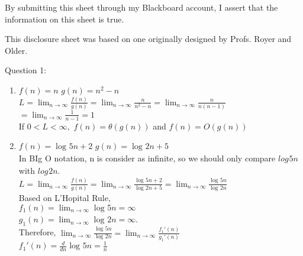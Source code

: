 \documentclass[12pt]{article}
\begin{document}
\vspace*{40ex}

By submitting this sheet through my Blackboard account, I assert that the information on this sheet is true.


\hfill {\tiny This disclosure sheet was based on one originally designed
  by
  Profs. Royer and Older.}


\pagebreak
\large Question 1:\\
\normalsize 
\begin{enumerate}[label=(\alph*)]
  \item $f(n) = n$ \hspace{1cm} $g(n) = n^2 - n$ \vspace{1mm} \\
    $L = \lim_{n\to\infty} \frac{f(n)}{g(n)} = \lim_{n\to\infty} \frac{n}{n^2 - n} = \lim_{n\to\infty} \frac{n}{n(n-1)}$ \vspace{1mm} \\
    $= \lim_{n\to\infty} \frac{1}{n - 1} = 1$ \vspace{1mm} \\
    If $0 < L < \infty,$ $f(n) = \theta(g(n))$ and $f(n) = O(g(n)) $
  \item $f(n) = \log_{}{5n} + 2$ \hspace{1cm} $g(n) = \log_{}{2n} + 5$ \vspace{1mm} \\
    In BIg O notation, n is consider as infinite, so we should only compare $log_{}{5n}$ with $log_{}{2n}$. \vspace{1mm} \\
    $L = \lim_{n\to\infty} \frac{f(n)}{g(n)} = \lim_{n\to\infty} \frac{\log_{}{5n} + 2}{\log_{}{2n} + 5} 
    = \lim_{n\to\infty} \frac{\log_{}{5n}}{\log_{}{2n}}$ \vspace{2mm} \\
    Based on L'Hopital Rule, \vspace{1mm} \\
    $f_1(n) = \lim_{n\to\infty} \log_{}{5n} = \infty $ \vspace{1mm} \\
    $g_1(n) = \lim_{n\to\infty} \log_{}{2n} = \infty $. \vspace{1mm} \\
    Therefore, $\lim_{n\to\infty} \frac{\log_{}{5n}}{\log_{}{2n}} = \lim_{n\to\infty} \frac{f_1'(n)}{g_1'(n)}$ \vspace{1mm} \\
    $f_1'(n) = \frac{d}{dn}\log_{}{5n} = \frac{1}{n}$ \vspace{1mm} \\

\end{enumerate}
\end{document}
